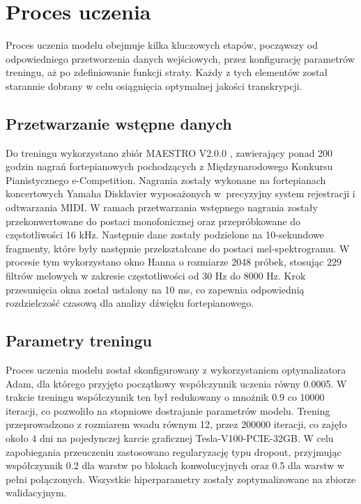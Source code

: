 \documentclass[a4paper,twoside,12pt]{book}
\begin{document}
\section{Proces uczenia}
Proces uczenia modelu obejmuje kilka kluczowych etapów, począwszy od odpowiedniego przetworzenia danych wejściowych, przez konfigurację parametrów treningu, aż po zdefiniowanie funkcji straty. Każdy z tych elementów został starannie dobrany w celu osiągnięcia optymalnej jakości transkrypcji.

\subsection{Przetwarzanie wstępne danych}

Do treningu wykorzystano zbiór MAESTRO V2.0.0 \cite{bib:hawthorne2018enabling}, zawierający ponad 200 godzin nagrań fortepianowych pochodzących z Międzynarodowego Konkursu Pianistycznego e-Competition. Nagrania zostały wykonane na fortepianach koncertowych Yamaha Disklavier wyposażonych w~precyzyjny system rejestracji i odtwarzania MIDI. W ramach przetwarzania wstępnego nagrania zostały przekonwertowane do postaci monofonicznej oraz przepróbkowane do częstotliwości 16 kHz. Następnie dane zostały podzielone na 10-sekundowe fragmenty, które były następnie przekształcane do postaci mel-spektrogramu. W procesie tym wykorzystano okno Hanna o rozmiarze 2048 próbek, stosując 229 filtrów melowych w zakresie częstotliwości od 30 Hz do 8000 Hz. Krok przesunięcia okna został ustalony na 10 ms, co zapewnia odpowiednią rozdzielczość czasową dla analizy dźwięku fortepianowego.

\subsection{Parametry treningu}

Proces uczenia modelu został skonfigurowany z wykorzystaniem optymalizatora Adam, dla którego przyjęto początkowy współczynnik uczenia równy 0.0005. W trakcie treningu współczynnik ten był redukowany o mnożnik 0.9 co 10000 iteracji, co pozwoliło na stopniowe dostrajanie parametrów modelu. Trening przeprowadzono z rozmiarem wsadu równym 12, przez 200000 iteracji, co zajęło około 4 dni na pojedynczej karcie graficznej Tesla-V100-PCIE-32GB. W celu zapobiegania przeuczeniu zastosowano regularyzację typu dropout, przyjmując współczynnik 0.2 dla warstw po blokach konwolucyjnych oraz 0.5 dla warstw w pełni połączonych. Wszystkie hiperparametry zostały zoptymalizowane na zbiorze walidacyjnym.
\end{document}
